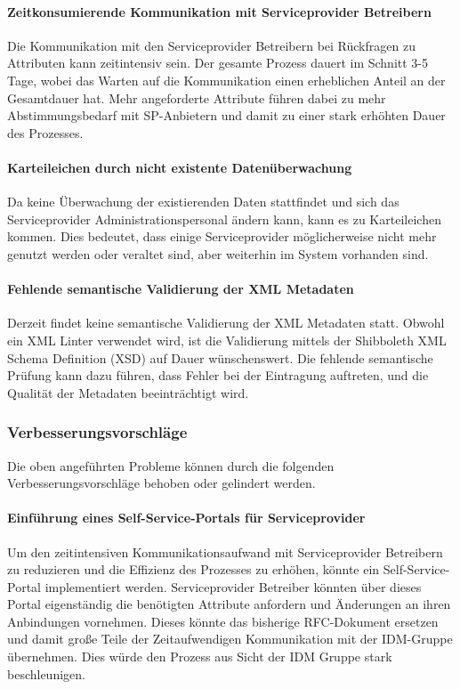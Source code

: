 \documentclass[a4paper, fontsize=11pt]{scrartcl}
\begin{document}
\paragraph{Zeitkonsumierende Kommunikation mit Serviceprovider Betreibern}
Die Kommunikation mit den Serviceprovider Betreibern bei Rückfragen zu Attributen kann zeitintensiv sein.
Der gesamte Prozess dauert im Schnitt 3-5 Tage, wobei das Warten auf die Kommunikation einen erheblichen Anteil an der Gesamtdauer hat.
Mehr angeforderte Attribute führen dabei zu mehr Abstimmungsbedarf mit SP-Anbietern und damit zu einer stark erhöhten Dauer des Prozesses.

\paragraph{Karteileichen durch nicht existente Datenüberwachung}
Da keine Überwachung der existierenden Daten stattfindet und sich das Serviceprovider Administrationspersonal ändern kann, kann es zu Karteileichen kommen.
Dies bedeutet, dass einige Serviceprovider möglicherweise nicht mehr genutzt werden oder veraltet sind, aber weiterhin im System vorhanden sind.

\paragraph{Fehlende semantische Validierung der XML Metadaten}

Derzeit findet keine semantische Validierung der XML Metadaten statt.
Obwohl ein XML Linter verwendet wird, ist die Validierung mittels der Shibboleth XML Schema Definition (XSD) auf Dauer wünschenswert.
Die fehlende semantische Prüfung kann dazu führen, dass Fehler bei der Eintragung auftreten, und die Qualität der Metadaten beeinträchtigt wird.

\subsubsection{Verbesserungsvorschläge}
Die oben angeführten Probleme können durch die folgenden Verbesserungsvorschläge behoben oder gelindert werden.

\paragraph{Einführung eines Self-Service-Portals für Serviceprovider}
Um den zeitintensiven Kommunikationsaufwand mit Serviceprovider Betreibern zu reduzieren und die Effizienz des Prozesses zu erhöhen, könnte ein Self-Service-Portal implementiert werden.
Serviceprovider Betreiber könnten über dieses Portal eigenständig die benötigten Attribute anfordern und Änderungen an ihren Anbindungen vornehmen.
Dieses könnte das bisherige RFC-Dokument ersetzen und damit große Teile der Zeitaufwendigen Kommunikation mit der IDM-Gruppe übernehmen. Dies würde den Prozess aus Sicht der IDM Gruppe stark beschleunigen.
\end{document}
